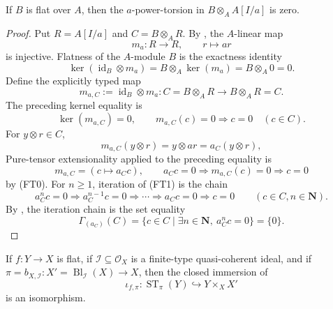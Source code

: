 \begin{lemma}
  \label{lemma:nagata-flat-strict-transform-no-torsion}

  If $B$ is flat over $A$, then the $a$-power-torsion in
  $B\otimes_AA[I/a]$ is zero.
\end{lemma}

\begin{proof}
  Put $R=A[I/a]$ and $C=B\otimes_AR$.  By
  , the $A$-linear map
  \[
    m_a\colon R\to R,\qquad r\mapsto ar
  \]
  is injective.  Flatness of the $A$-module $B$ is the exactness identity
  \[
    \ker(\operatorname{id}_B\otimes m_a)
      =B\otimes_A\ker(m_a)=B\otimes_A0=0.
  \]
  Define the explicitly typed map
  \[
    m_{a,C}:=\operatorname{id}_B\otimes m_a\colon
      C=B\otimes_AR\longrightarrow B\otimes_AR=C.
  \]
  The preceding kernel equality is
  \[
    \ker(m_{a,C})=0,
    \qquad
    m_{a,C}(c)=0\Longrightarrow c=0\quad(c\in C).               \tag{FT0}
  \]
  For $y\otimes r\in C$,
  \[
    m_{a,C}(y\otimes r)
      =y\otimes ar
      =a_C(y\otimes r),
  \]
  Pure-tensor extensionality applied to the preceding equality is
  \[
    m_{a,C}=(c\mapsto a_Cc),\qquad
    a_Cc=0\Longrightarrow m_{a,C}(c)=0\Longrightarrow c=0       \tag{FT1}
  \]
  by (FT0).  For $n\geq1$, iteration of (FT1) is the chain
  \[
    a_C^nc=0
      \Longrightarrow a_C^{n-1}c=0
      \Longrightarrow\cdots\Longrightarrow a_Cc=0
      \Longrightarrow c=0
      \qquad(c\in C,n\in\mathbf N).
  \]
  By , the iteration chain is the set equality
  \[
    \Gamma_{(a_C)}(C)
      =\{c\in C\mid\exists n\in\mathbf N,\ a_C^nc=0\}
      =\{0\}.
  \]
\end{proof}

\begin{corollary}
  \label{cor:nagata-flat-strict-transform-base-change}

  If $f\colon Y\to X$ is flat, if
  $\mathcal I\subseteq\mathcal O_X$ is a finite-type quasi-coherent ideal,
  and if
  $\pi=b_{X,\mathcal I}\colon X'=\operatorname{Bl}_{\mathcal I}(X)\to X$,
  then the closed immersion of 
  \[
    \iota_{f,\pi}\colon\operatorname{ST}_\pi(Y)\hookrightarrow Y\times_XX'
  \]
  is an isomorphism.
\end{corollary}

